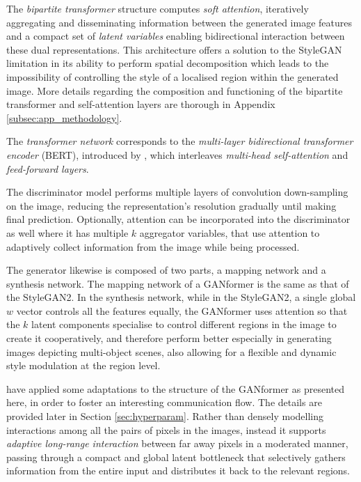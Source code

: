 \documentclass{article}
\begin{document}
	The \textit{bipartite transformer} structure computes \textit{soft attention}, iteratively aggregating 
	and disseminating information between the generated image features and a compact set of 
	\textit{latent variables} enabling bidirectional interaction between these dual representations. 
	This architecture offers a solution to the StyleGAN limitation in its ability to perform spatial 
	decomposition which leads to the impossibility of controlling the style of a localised region 
	within the generated image.
	More details regarding the composition and functioning of the bipartite transformer and 
	self-attention layers are thorough in Appendix \ref{subsec:app_methodology}. 
	
	The \textit{transformer network} corresponds to the \textit{multi-layer bidirectional transformer 
		encoder} (BERT), introduced by \citet{devlin2019bert}, which interleaves \textit{multi-head 
		self-attention} and \textit{feed-forward layers}. 
	
	The discriminator model performs multiple layers of convolution down-sampling on the image, 
	reducing the representation's resolution gradually until making final prediction. 
	Optionally, attention can be incorporated into the discriminator as well where it has multiple $k$ 
	aggregator variables, that use attention to adaptively collect information from the image while being 
	processed. 
	
	The generator likewise is composed of two parts, a mapping network and a synthesis 
	network. 
	The mapping network of a GANformer is the same as that of the StyleGAN2.
	In the synthesis network, while in the StyleGAN2, a single global $w$ vector controls all the 
	features equally, the GANformer uses attention so that the $k$ latent components specialise to 
	control different regions in the image to create it cooperatively, and therefore perform better 
	especially in generating images depicting multi-object scenes, also allowing for a flexible and 
	dynamic style modulation at the region level.
	
	\citet{hudson2021generative} have applied some adaptations to the structure of the GANformer as 
	presented here, in order to foster an interesting communication flow. The details are provided later 
	in Section \ref{sec:hyperparam}.
	Rather than densely modelling interactions among all the pairs of pixels in the images, instead it 
	supports \textit{adaptive long-range interaction} between far away pixels in a moderated manner, 
	passing through a compact and global latent bottleneck that selectively gathers information from 
	the entire input and distributes it back to the relevant regions. 
	
\end{document}
